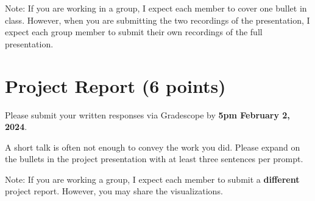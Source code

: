 \documentclass{article}
\begin{document}
Note: If you are working in a group, I expect each member to
cover one bullet in class.
However, when you are submitting the two recordings of the presentation,
I expect each group member to submit their own recordings of the full
presentation.

\section{Project Report (6 points)}
Please submit your written responses via Gradescope
by \textbf{5pm February 2, 2024}.

A short talk is often not enough to convey the work you did.
Please expand on the bullets in the project presentation with
at least three sentences per prompt.

Note: If you are working a group, I expect each member to submit
a \textbf{different} project report.
However, you may share the visualizations.
\end{document}
